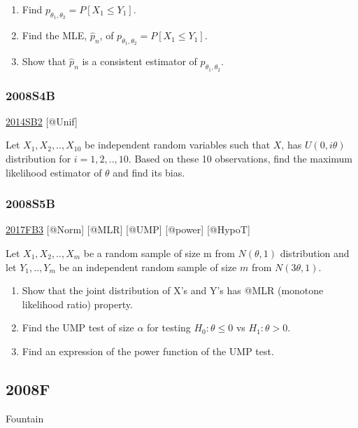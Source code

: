 \documentclass[6pt,Portrait]{article}
\begin{document}
\begin{enumerate}
\def\labelenumi{(\alph{enumi})}
\item
  Find \(p_{\theta_1,\theta_2}= P[X_1\le Y_1]\).
\item
  Find the MLE, \(\hat p_n\), of
  \(p_{\theta_1,\theta_2}= P[X_1\le Y_1]\).
\item
  Show that \(\hat p_n\) is a consistent estimator of
  \(p_{\theta_1,\theta_2}\).
\end{enumerate}

\hypertarget{s4b}{%
\subsubsection{2008S4B}\label{s4b}}

\protect\hyperlink{sb2-2}{2014SB2} {[}@Unif{]}

Let \(X_1,X_2,..,X_{10}\) be independent random variables such that
\(X\), has \(U(0,i\theta)\) distribution for \(i= 1,2,..,10\). Based on
these 10 observations, find the maximum likelihood estimator of
\(\theta\) and find its bias.

\hypertarget{s5b}{%
\subsubsection{2008S5B}\label{s5b}}

\protect\hyperlink{fb3-3}{2017FB3} {[}@Norm{]} {[}@MLR{]} {[}@UMP{]}
{[}@power{]} {[}@HypoT{]}

Let \(X_1,X_2,..,X_{m}\) be a random sample of size m from
\(N(\theta,1)\) distribution and let \(Y_1,..,Y_m\) be an independent
random sample of size \(m\) from \(N(3\theta,1)\).

\begin{enumerate}
\def\labelenumi{(\alph{enumi})}
\item
  Show that the joint distribution of X's and Y's has @MLR (monotone
  likelihood ratio) property.
\item
  Find the UMP test of size \(\alpha\) for testing \(H_0:\theta\le0\) vs
  \(H_1:\theta>0\).
\item
  Find an expression of the power function of the UMP test.
\end{enumerate}

\hypertarget{f-4}{%
\subsection{2008F}\label{f-4}}

Fountain
\end{document}
